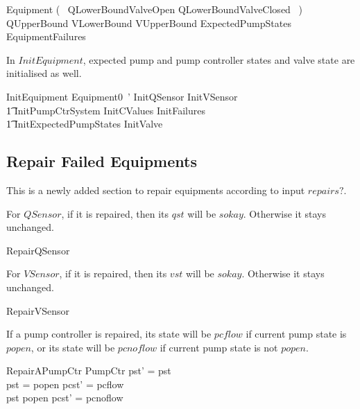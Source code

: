 \documentclass{report} %
\begin{document}
\begin{zed}
  Equipment  (~ QLowerBoundValveOpen \lor QLowerBoundValveClosed ~) \land  QUpperBound \land VLowerBound \land VUpperBound \land ExpectedPumpStates \land EquipmentFailures
\end{zed}

In $InitEquipment$, expected pump and pump controller states and valve state are initialised as well.
\begin{zed}
  InitEquipment  Equipment0~' \land InitQSensor \land InitVSensor \land \\
    \t1 InitPumpCtrSystem \land InitCValues \land InitFailures \land \\
    \t1 InitExpectedPumpStates \land InitValve
\end{zed}

\subsection{Repair Failed Equipments}

This is a newly added section to repair equipments according to input $repairs?$.

For $QSensor$, if it is repaired, then its $qst$ will be $sokay$. Otherwise it stays unchanged.
\begin{zed} RepairQSensor 
\end{zed}

For $VSensor$, if it is repaired, then its $vst$ will be $sokay$. Otherwise it stays unchanged.
\begin{zed} RepairVSensor 
\end{zed}

If a pump controller is repaired, its state will be $pcflow$ if current pump state is $popen$, or its state will be $pcnoflow$ if current pump state is not $popen$.
\begin{schema}{RepairAPumpCtr}
  \Delta PumpCtr
  \where
  pst' = pst \\
  pst = popen \implies pcst' = pcflow \\
  pst \neq popen \implies pcst' = pcnoflow
\end{schema}
\end{document}
